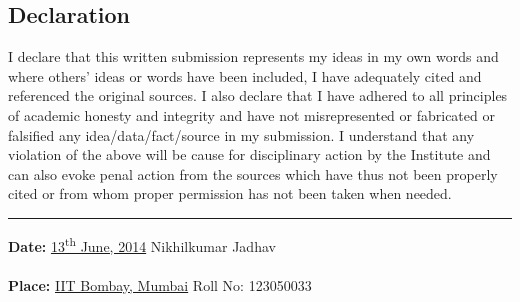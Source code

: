 \begin{center}
\section*{Declaration}
\end{center}
I declare that this written submission represents my ideas in my own words and where others' ideas or words have been included, I have adequately cited and referenced the original sources. I also declare that I have adhered to all principles of academic honesty and integrity and have not misrepresented or fabricated or falsified any idea/data/fact/source in my submission. I understand that any violation of the above will be cause for disciplinary action by the Institute and can also evoke penal action from the sources which have thus not been properly cited or from whom proper permission has not been taken when needed.
\vspace{1.5in}\\
\begin{flushright}
\rule{100pt}{1pt}
\end{flushright}
\textbf{Date:} \underline{13\textsuperscript{th} June, 2014} \hspace{7.9cm} Nikhilkumar Jadhav\\ \\
\textbf{Place:} \underline{IIT Bombay, Mumbai} \hspace{7.2cm}Roll No: 123050033 \\ 
